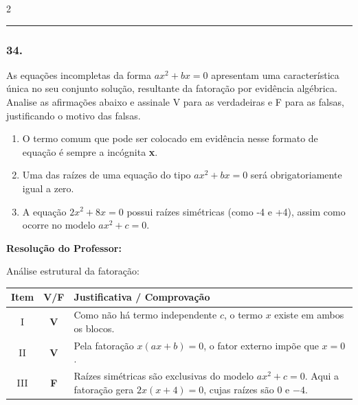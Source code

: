 \begin{multicols*}{2}
\par\vspace{\espacoQuestao}

\noindent\textcolor{CorLinha}{\rule{\linewidth}{0.5pt}} 
\par\vspace{\espacoPreQuestao}
\subsubsection*{34.} As equações incompletas da forma $ ax^2 + bx = 0 $ apresentam uma característica única no seu conjunto solução, resultante da fatoração por evidência algébrica. Analise as afirmações abaixo e assinale V para as verdadeiras e F para as falsas, justificando o motivo das falsas.
\begin{enumerate}[label=\Roman*., itemsep=\espacoAlt]
    \item O termo comum que pode ser colocado em evidência nesse formato de equação é sempre a incógnita \textbf{x}.
    \item Uma das raízes de uma equação do tipo $ ax^2 + bx = 0 $ será obrigatoriamente igual a zero.
    \item A equação $ 2x^2 + 8x = 0 $ possui raízes simétricas (como -4 e +4), assim como ocorre no modelo $ ax^2 + c = 0 $.
\end{enumerate}

\ifgabarito
    \begin{tcolorbox}[colback=CorTitUm!5, colframe=CorTitUm, boxrule=1pt, arc=4pt, left=6pt, right=6pt, top=6pt, bottom=6pt]
    \small\textbf{\textcolor{CorTitUm}{Resolução do Professor:}}\par\vspace{0.1cm}
    \color{CinzaEscuro}
    Análise estrutural da fatoração:
    \vspace{0.1cm}
    \begin{center}
    \begin{tabular}{|c|c|l|}
    \hline
    \textbf{Item} & \textbf{V/F} & \textbf{Justificativa / Comprovação} \\
    \hline
    I & \textbf{V} & Como não há termo independente $c$, o termo $x$ existe em ambos os blocos. \\
    \hline
    II & \textbf{V} & Pela fatoração $x(ax + b) = 0$, o fator externo impõe que $x = 0$. \\
    \hline
    III & \textbf{F} & Raízes simétricas são exclusivas do modelo $ax^2+c=0$. Aqui a fatoração gera $2x(x+4)=0$, cujas raízes são $0$ e $-4$. \\
    \hline
    \end{tabular}
    \end{center}
    \end{tcolorbox}
\fi


\end{multicols*}
